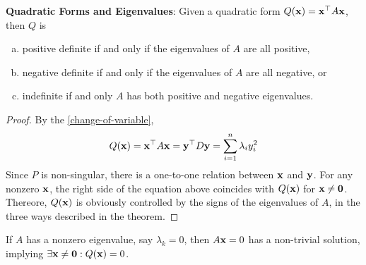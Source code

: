     \begin{Thm}\label{11-2}
        \textbf{Quadratic Forms and Eigenvalues}:
        Given a quadratic form $Q(\mathbf{x}) = \mathbf{x}^{\top}A\mathbf{x}$, then $Q$ is
        \begin{enumerate}[a.]
            \item positive definite if and only if the eigenvalues of $A$ are all positive,
            \item negative definite if and only if the eigenvalues of $A$ are all negative, or
            \item indefinite if and only $A$ has both positive and negative eigenvalues.
        \end{enumerate}
        \begin{proof}
            By the \cref{change-of-variable},
            \begin{equation}
                Q(\mathbf{x}) = \mathbf{x}^{\top}A\mathbf{x} = \mathbf{y}^{\top}D\mathbf{y} = \sum_{i = 1}^n  \lambda_iy_i^2
            \end{equation}
            Since $P$ is non-singular, there is a one-to-one relation between $\mathbf{x}$ and $\mathbf{y}$. For any nonzero $\mathbf{x}$, the right side of the equation above coincides with $Q(\mathbf{x})$ for $\mathbf{x}\neq \mathbf{0}$. Thereore, $Q(\mathbf{x})$ is obviously controlled by the signs of the eigenvalues of $A$, in the three ways described in the theorem.
        \end{proof}
        \begin{Rem}
            If $A$ has a nonzero eigenvalue, say $\lambda_k = 0$, then $A\mathbf{x} = 0$ has a non-trivial solution, implying $\exists\mathbf{x}\neq \mathbf{0}: Q(\mathbf{x}) = 0$.
        \end{Rem}
    \end{Thm}